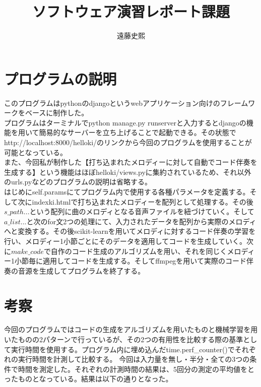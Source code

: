 \documentclass{article}
\title{ソフトウェア演習レポート課題}
\author{遠藤史熙}
\begin{document}
\maketitle



\section{プログラムの説明}
このプログラムはpythonのdjangoというwebアプリケーション向けのフレームワークをベースに制作した。\\
プログラムはターミナルでpython manage.py runserverと入力するとdjangoの機能を用いて簡易的なサーバーを立ち上げることで起動できる。その状態でhttp://localhost:8000/helloki/のリンクから今回のプログラムを使用することが可能となっている。\\
また、今回私が制作した【打ち込まれたメロディーに対して自動でコード伴奏を生成する】という機能はほぼhelloki/views.pyに集約されているため、それ以外のurls.pyなどのプログラムの説明は省略する。\\
はじめにself.paramsにてプログラム内で使用する各種パラメータを定義する。そして次にindexki.htmlで打ち込まれたメロディーを配列として処理する。その後$s\_path...$という配列に曲のメロディとなる音声ファイルを紐づけていく。そして$a\_list...$と次のfor文2つの処理にて、入力されたデータを配列から実際のメロディへと変換する。その後scikit-learnを用いてメロディに対するコード伴奏の学習を行い、メロディー1小節ごとにそのデータを適用してコードを生成していく。次に$make\_code$で自作のコード生成のアルゴリズムを用い、それを同じくメロディー1小節毎に適用してコードを生成する。そしてffmpegを用いて実際のコード伴奏の音源を生成してプログラムを終了する。

\section{考察}
今回のプログラムではコードの生成をアルゴリズムを用いたものと機械学習を用いたものの2パターンで行っているが、その2つの有用性を比較する際の基準として実行時間を使用する。プログラム内に埋め込んだtime.perf\_counter()でそれぞれの実行時間を計測して比較する。
今回は入力量を無し・半分・全ての3つの条件で時間を測定した。それぞれの計測時間の結果は、5回分の測定の平均値をとったものとなっている。結果は以下の通りとなった。\\\\\\\\\\
\end{document}
